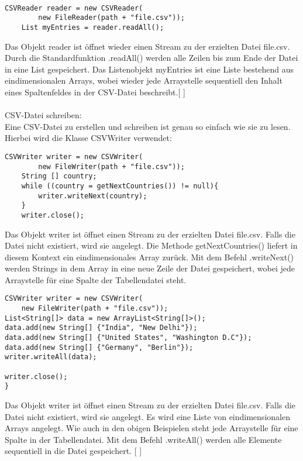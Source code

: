 \documentclass[FIPLY_base.tex]{subfiles}
\begin{document}
\
\begin{lstlisting}[caption={Verwendung von CSVReader: Möglichkeit 2, alles auf einmal},label=DescriptiveLabel]
	CSVReader reader = new CSVReader(
		new FileReader(path + "file.csv"));
	List myEntries = reader.readAll();
\end{lstlisting}

Das Objekt reader ist öffnet wieder einen Stream zu der erzielten Datei \grqq{}file.csv\grqq{}. Durch die Standardfunktion .readAll() werden alle Zeilen bis zum Ende der Datei in eine List gespeichert. Das Listenobjekt myEntries ist eine Liste bestehend aus eindimensionalen Arrays, wobei wieder jede Arraystelle sequentiell den Inhalt eines Spaltenfeldes in der CSV-Datei beschreibt.[ \cite{exportCSVSourceRead}] 
\ \\
\ \\
CSV-Datei schreiben:
\ \\
Eine CSV-Datei zu erstellen und schreiben ist genau so einfach wie sie zu lesen. Hierbei wird die Klasse \grqq{}CSVWriter\grqq{} verwendet:

\begin{lstlisting}[caption={Verwendung von CSVWriter: Möglichkeit 1, iterativ},label=DescriptiveLabel]
	CSVWriter writer = new CSVWriter(
		new FileWriter(path + "file.csv"));
	String [] country;
	while ((country = getNextCountries()) != null){
		writer.writeNext(country);
	}
	writer.close();
\end{lstlisting}
Das Objekt writer ist öffnet einen Stream zu der erzielten Datei \grqq{}file.csv\grqq{}. Falls die Datei nicht existiert, wird sie angelegt.
Die Methode getNextCountries() liefert in diesem Kontext ein eindimensionales Array zurück. Mit dem Befehl .writeNext() werden Strings in dem Array in eine neue Zeile der Datei gespeichert, wobei jede Arraystelle für eine Spalte der Tabellendatei steht.
\begin{lstlisting}[caption={Verwendung von CSVWriter: Möglichkeit 2, alles auf einmal},label=DescriptiveLabel]
	CSVWriter writer = new CSVWriter(
	new FileWriter(path + "file.csv"));
List<String[]> data = new ArrayList<String[]>();
data.add(new String[] {"India", "New Delhi"});
data.add(new String[] {"United States", "Washington D.C"});
data.add(new String[] {"Germany", "Berlin"});
writer.writeAll(data);

writer.close();
}
\end{lstlisting}
Das Objekt writer ist öffnet einen Stream zu der erzielten Datei \grqq{}file.csv\grqq{}. Falls die Datei nicht existiert, wird sie angelegt.
Es wird eine Liste von eindimensionalen Arrays angelegt. Wie auch in den obigen Beispielen steht jede Arraystelle für eine Spalte in der Tabellendatei. Mit dem Befehl .writeAll() werden alle Elemente sequentiell in die Datei gespeichert.
[\citetitle{exportCSVSourceWrite} \cite{exportCSVSourceWrite}] 
\end{document}
